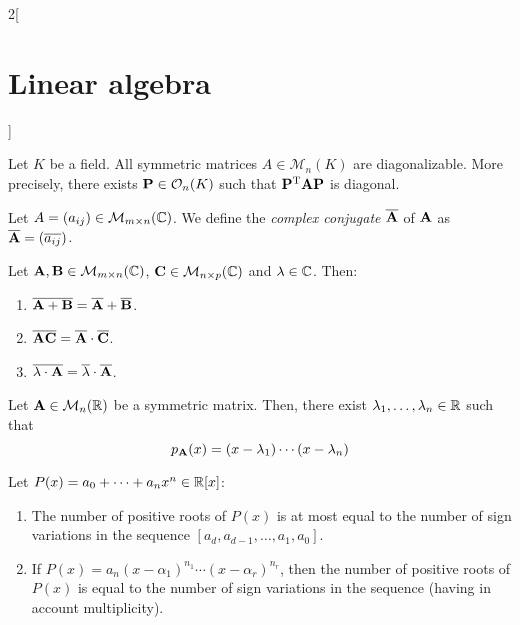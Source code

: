 \documentclass[../../../main.tex]{subfiles}
\begin{document}
\begin{multicols}{2}[\section{Linear algebra}]
\begin{theorem}
  \end{theorem}
  \begin{corollary}
    Let $K$ be a field. All symmetric matrices $A\in\mathcal{M}_n(K)$ are diagonalizable. More precisely, there exists $\boldsymbol{\mathrm{P}}\in\mathcal{O}_n(K)$ such that $\vb{P}^{\mathrm{T}}\boldsymbol{\mathrm{A}}\boldsymbol{\mathrm{P}}$ is diagonal.
  \end{corollary}
  \begin{definition}
    Let $A=(a_{ij})\in\mathcal{M}_{m\times n}(\mathbb{C})$. We define the \emph{complex conjugate} $\overline{\boldsymbol{\mathrm{A}}}$ of $\boldsymbol{\mathrm{A}}$ as $\overline{\boldsymbol{\mathrm{A}}}=(\overline{a_{ij}})$.
  \end{definition}
  \begin{proposition}
    Let $\boldsymbol{\mathrm{A}},\boldsymbol{\mathrm{B}}\in\mathcal{M}_{m\times n}(\mathbb{C})$, $\boldsymbol{\mathrm{C}}\in\mathcal{M}_{n\times p}(\mathbb{C})$ and $\lambda\in\mathbb{C}$. Then:
    \begin{enumerate}
      \item $\overline{\boldsymbol{\mathrm{A}}+\boldsymbol{\mathrm{B}}}=\overline{\boldsymbol{\mathrm{A}}}+\overline{\boldsymbol{\mathrm{B}}}$.
      \item $\overline{\boldsymbol{\mathrm{A}}\boldsymbol{\mathrm{C}}}=\overline{\boldsymbol{\mathrm{A}}}\cdot\overline{\boldsymbol{\mathrm{C}}}$.
      \item $\overline{\lambda\cdot\boldsymbol{\mathrm{A}}}=\overline{\lambda}\cdot\overline{\boldsymbol{\mathrm{A}}}$.
    \end{enumerate}
  \end{proposition}
  \begin{corollary}
    Let $\boldsymbol{\mathrm{A}}\in\mathcal{M}_n(\mathbb{R})$ be a symmetric matrix. Then, there exist $\lambda_1,\ldots,\lambda_n\in\mathbb{R}$ such that $$p_{\boldsymbol{\mathrm{A}}}(x)=(x-\lambda_1 )\cdots(x-\lambda_n)$$
  \end{corollary}
  \begin{theorem}
    Let $P(x)=a_0+\cdots+a_nx^n\in\mathbb{R}[x]$:
    \begin{enumerate}
      \item The number of positive roots of $P(x)$ is at most equal to the number of sign variations in the sequence $[a_d,a_{d-1},\ldots,a_1,a_0]$.
      \item If $P(x)=a_n(x-\alpha_1)^{n_1}\cdots(x-\alpha_r)^{n_r}$, then the number of positive roots of $P(x)$ is equal to the number of sign variations in the sequence (having in account multiplicity).
    \end{enumerate}
  \end{theorem}
\end{multicols}
\end{document}
